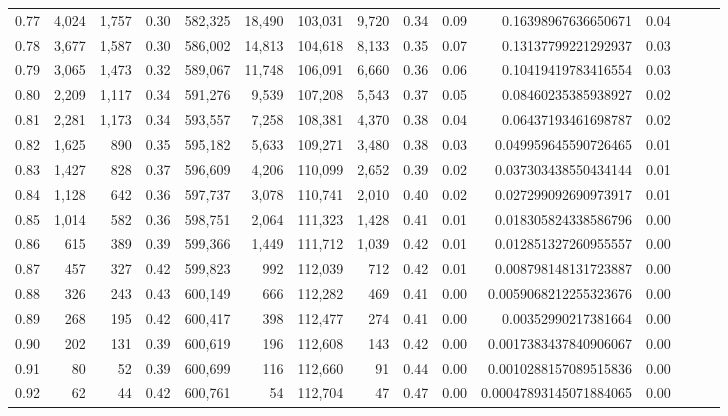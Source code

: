 \begin{tabular}{rrrrrrrrrrrrrrr}
0.77 &   4,024 &  1,757 &  0.30 &  582,325 &   18,490 &  103,031 &    9,720 &  0.34 &  0.09 &     0.16398967636650671 &      0.04 \\
0.78 &   3,677 &  1,587 &  0.30 &  586,002 &   14,813 &  104,618 &    8,133 &  0.35 &  0.07 &     0.13137799221292937 &      0.03 \\
0.79 &   3,065 &  1,473 &  0.32 &  589,067 &   11,748 &  106,091 &    6,660 &  0.36 &  0.06 &     0.10419419783416554 &      0.03 \\
0.80 &   2,209 &  1,117 &  0.34 &  591,276 &    9,539 &  107,208 &    5,543 &  0.37 &  0.05 &     0.08460235385938927 &      0.02 \\
0.81 &   2,281 &  1,173 &  0.34 &  593,557 &    7,258 &  108,381 &    4,370 &  0.38 &  0.04 &     0.06437193461698787 &      0.02 \\
0.82 &   1,625 &    890 &  0.35 &  595,182 &    5,633 &  109,271 &    3,480 &  0.38 &  0.03 &    0.049959645590726465 &      0.01 \\
0.83 &   1,427 &    828 &  0.37 &  596,609 &    4,206 &  110,099 &    2,652 &  0.39 &  0.02 &    0.037303438550434144 &      0.01 \\
0.84 &   1,128 &    642 &  0.36 &  597,737 &    3,078 &  110,741 &    2,010 &  0.40 &  0.02 &    0.027299092690973917 &      0.01 \\
0.85 &   1,014 &    582 &  0.36 &  598,751 &    2,064 &  111,323 &    1,428 &  0.41 &  0.01 &    0.018305824338586796 &      0.00 \\
0.86 &     615 &    389 &  0.39 &  599,366 &    1,449 &  111,712 &    1,039 &  0.42 &  0.01 &    0.012851327260955557 &      0.00 \\
0.87 &     457 &    327 &  0.42 &  599,823 &      992 &  112,039 &      712 &  0.42 &  0.01 &    0.008798148131723887 &      0.00 \\
0.88 &     326 &    243 &  0.43 &  600,149 &      666 &  112,282 &      469 &  0.41 &  0.00 &   0.0059068212255323676 &      0.00 \\
0.89 &     268 &    195 &  0.42 &  600,417 &      398 &  112,477 &      274 &  0.41 &  0.00 &     0.00352990217381664 &      0.00 \\
0.90 &     202 &    131 &  0.39 &  600,619 &      196 &  112,608 &      143 &  0.42 &  0.00 &   0.0017383437840906067 &      0.00 \\
0.91 &      80 &     52 &  0.39 &  600,699 &      116 &  112,660 &       91 &  0.44 &  0.00 &   0.0010288157089515836 &      0.00 \\
0.92 &      62 &     44 &  0.42 &  600,761 &       54 &  112,704 &       47 &  0.47 &  0.00 &  0.00047893145071884065 &      0.00 \\

\end{tabular}
